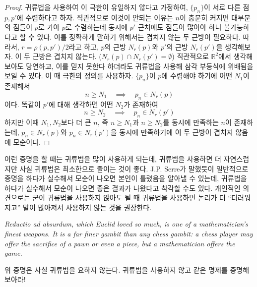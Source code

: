 \begin{proof}
    귀류법을 사용하여 이 극한이 유일하지 않다고 가정하여, $\{p_n\}$이 서로 다른 점 $p, p'$에 수렴하다고 하자.
    직관적으로 이것이 안되는 이유는 $n$이 충분히 커지면 대부분의 점들이 $p$로 가야 $p$로 수렴하는데 동시에 $p'$ 근처에도 점들이 많아야 하니 불가능하다고 할 수 있다.
    이를 정확하게 말하기 위해서는 겹치지 않는 두 근방이 필요하다.
    따라서, $r = \rho(p, p') / 2$라고 하고, $p$의 근방 $N_r(p)$와 $p'$의 근방 $N_r(p')$을 생각해보자.
    이 두 근방은 겹치지 않는다. ($N_r(p) \cap N_r(p') = \emptyset$)
    직관적으로 $\mathbb{R}^2$에서 생각해보아도 당연하고, 이를 믿지 못한다 하더라도 귀류법을 사용해 삼각 부등식에 위배됨을 보일 수 있다.
    이 때 극한의 정의를 사용하자. $\{p_n\}$이 $p$에 수렴해야 하기에 어떤 $N_1$이 존재해서
    \begin{equation}
        n \geq N_1 \quad \implies \quad p_n \in N_r(p) 
    \end{equation}
    이다. 똑같이 $p'$에 대해 생각하면 어떤 $N_2$가 존재하여
    \begin{equation}
        n \geq N_2 \quad \implies \quad p_n \in N_r(p')
    \end{equation}
    하지만 이때 $N_1, N_2$보다 더 큰 $n$, 즉 $n \geq N_1$과 $n \geq N_2$를 동시에 만족하는 $n$이 존재하는데, $p_n \in N_r(p)$와 $p_n \in N_r(p')$을 동시에 만족하기에 이 두 근방이 겹치지 않음에 모순이다.
\end{proof}

\begin{remark}
   이런 증명을 할 때는 귀류법을 많이 사용하게 되는데, 귀류법을 사용하면 더 자연스럽지만 사실 귀류법은 최소한으로 줄이는 것이 좋다.
   J.P. Serre가 말했듯이 일반적으로 증명을 하다가 실수해서 모순이 나오면 본인이 틀렸음을 알아낼 수 있는데, 귀류법을 하다가 실수해서 모순이 나오면 좋은 결과가 나왔다고 착각할 수도 있다.
   개인적인 의견으로는 굳이 귀류법을 사용하지 않아도 될 때 귀류법을 사용하면 논리가 더 ``더러워지고'' 말이 많아져서 사용하지 않는 것을 권장한다.

   \begin{displayquote}
        \textit{Reductio ad absurdum, which Euclid loved so much, is one of a mathematician's finest weapons.
        It is a far finer gambit than any chess gambit: a chess player may offer the sacrifice of a pawn or even a piece, but a mathematician offers the game.}
   \end{displayquote}

   위 증명은 사실 귀류법을 요하지 않는다. 귀류법을 사용하지 않고 같은 명제를 증명해보아라!
\end{remark}

